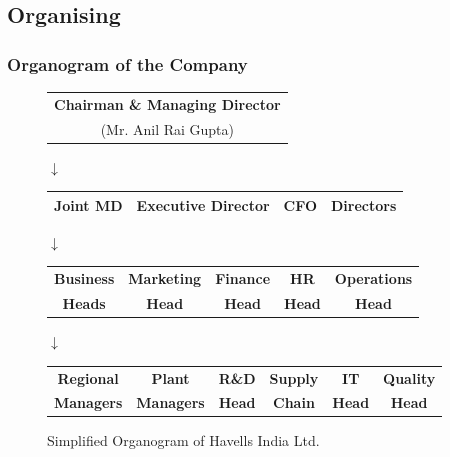 \documentclass[12pt,a4paper]{article}
\begin{document}
\subsection{Organising}

\subsubsection{Organogram of the Company}

\begin{figure}[H]
    \centering
    \begin{tabular}{|c|}
        \hline
        \textbf{Chairman \& Managing Director} \\
        (Mr. Anil Rai Gupta) \\
        \hline
    \end{tabular}
    
    \vspace{0.3cm}
    $\downarrow$
    \vspace{0.3cm}
    
    \begin{tabular}{|c|c|c|c|}
        \hline
        \textbf{Joint MD} & \textbf{Executive Director} & \textbf{CFO} & \textbf{Directors} \\
        \hline
    \end{tabular}
    
    \vspace{0.3cm}
    $\downarrow$
    \vspace{0.3cm}
    
    \begin{tabular}{|c|c|c|c|c|}
        \hline
        \textbf{Business} & \textbf{Marketing} & \textbf{Finance} & \textbf{HR} & \textbf{Operations} \\
        \textbf{Heads} & \textbf{Head} & \textbf{Head} & \textbf{Head} & \textbf{Head} \\
        \hline
    \end{tabular}
    
    \vspace{0.3cm}
    $\downarrow$
    \vspace{0.3cm}
    
    \begin{tabular}{|c|c|c|c|c|c|}
        \hline
        \textbf{Regional} & \textbf{Plant} & \textbf{R\&D} & \textbf{Supply} & \textbf{IT} & \textbf{Quality} \\
        \textbf{Managers} & \textbf{Managers} & \textbf{Head} & \textbf{Chain} & \textbf{Head} & \textbf{Head} \\
        \hline
    \end{tabular}
    
    \caption{Simplified Organogram of Havells India Ltd.}
\end{figure}
\end{document}
